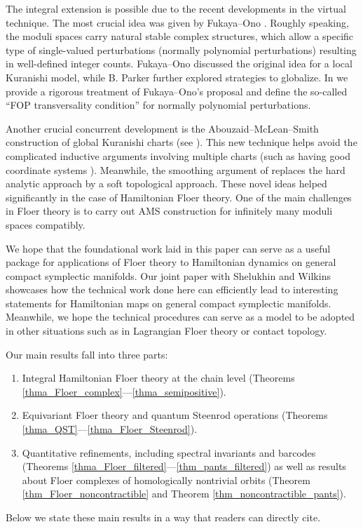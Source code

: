\documentclass[reqno, 10pt]{amsart}
\numberwithin{equation}{section}
\numberwithin{equation}{section}
\theoremstyle{definition}
\theoremstyle{remark}
\begin{document}
The integral extension is possible due to the recent developments in the virtual technique. The most crucial idea was given by Fukaya--Ono \cite{Fukaya_Ono_integer}. Roughly speaking, the moduli spaces carry natural stable complex structures, which allow a specific type of single-valued perturbations (normally polynomial perturbations) resulting in well-defined integer counts. Fukaya--Ono discussed the original idea for a local Kuranishi model, while B. Parker \cite{BParker_integer} further explored strategies to globalize. In \cite{Bai_Xu_2022} we provide a rigorous treatment of Fukaya--Ono's proposal and define the so-called ``FOP transversality condition'' for normally polynomial perturbations. 

Another crucial concurrent development is the Abouzaid--McLean--Smith construction of global Kuranishi charts (see \cite{AMS, Hirschi_Swaminathan, AMS2}). This new technique helps avoid the complicated inductive arguments involving multiple charts (such as having good coordinate systems \cite{FOOO_2016}). Meanwhile, the smoothing argument of \cite{AMS} replaces the hard analytic approach \cite{FOOO_smooth} by a soft topological approach. These novel ideas helped significantly in the case of Hamiltonian Floer theory. One of the main challenges in Floer theory is to carry out AMS construction for infinitely many moduli spaces compatibly. 


We hope that the foundational work laid in this paper can serve as a useful package for applications of Floer theory to Hamiltonian dynamics on general compact symplectic manifolds. Our joint paper with Shelukhin and Wilkins \cite{BSWX} showcases how the technical work done here can efficiently lead to interesting statements for Hamiltonian maps on general compact symplectic manifolds. Meanwhile, we hope the technical procedures can serve as a model to be adopted in other situations such as in Lagrangian Floer theory or contact topology.

Our main results fall into three parts:

\begin{enumerate}

\item Integral Hamiltonian Floer theory at the chain level (Theorems \ref{thma_Floer_complex}---\ref{thma_semipositive}).

\item Equivariant Floer theory and quantum Steenrod operations (Theorems \ref{thma_QST}---\ref{thma_Floer_Steenrod}).

\item Quantitative refinements, including spectral invariants and barcodes (Theorems \ref{thma_Floer_filtered}---\ref{thm_pants_filtered}) as well as results about Floer complexes of homologically nontrivial orbits (Theorem \ref{thm_Floer_noncontractible} and Theorem \ref{thm_noncontractible_pants}).
\end{enumerate}
Below we state these main results in a way that readers can directly cite.
\end{document}
